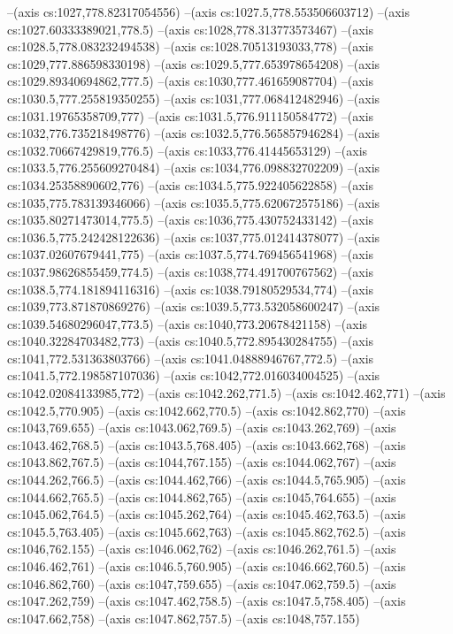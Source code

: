 --(axis cs:1027,778.82317054556)
--(axis cs:1027.5,778.553506603712)
--(axis cs:1027.60333389021,778.5)
--(axis cs:1028,778.313773573467)
--(axis cs:1028.5,778.083232494538)
--(axis cs:1028.70513193033,778)
--(axis cs:1029,777.886598330198)
--(axis cs:1029.5,777.653978654208)
--(axis cs:1029.89340694862,777.5)
--(axis cs:1030,777.461659087704)
--(axis cs:1030.5,777.255819350255)
--(axis cs:1031,777.068412482946)
--(axis cs:1031.19765358709,777)
--(axis cs:1031.5,776.911150584772)
--(axis cs:1032,776.735218498776)
--(axis cs:1032.5,776.565857946284)
--(axis cs:1032.70667429819,776.5)
--(axis cs:1033,776.41445653129)
--(axis cs:1033.5,776.255609270484)
--(axis cs:1034,776.098832702209)
--(axis cs:1034.25358890602,776)
--(axis cs:1034.5,775.922405622858)
--(axis cs:1035,775.783139346066)
--(axis cs:1035.5,775.620672575186)
--(axis cs:1035.80271473014,775.5)
--(axis cs:1036,775.430752433142)
--(axis cs:1036.5,775.242428122636)
--(axis cs:1037,775.012414378077)
--(axis cs:1037.02607679441,775)
--(axis cs:1037.5,774.769456541968)
--(axis cs:1037.98626855459,774.5)
--(axis cs:1038,774.491700767562)
--(axis cs:1038.5,774.181894116316)
--(axis cs:1038.79180529534,774)
--(axis cs:1039,773.871870869276)
--(axis cs:1039.5,773.532058600247)
--(axis cs:1039.54680296047,773.5)
--(axis cs:1040,773.20678421158)
--(axis cs:1040.32284703482,773)
--(axis cs:1040.5,772.895430284755)
--(axis cs:1041,772.531363803766)
--(axis cs:1041.04888946767,772.5)
--(axis cs:1041.5,772.198587107036)
--(axis cs:1042,772.016034004525)
--(axis cs:1042.02084133985,772)
--(axis cs:1042.262,771.5)
--(axis cs:1042.462,771)
--(axis cs:1042.5,770.905)
--(axis cs:1042.662,770.5)
--(axis cs:1042.862,770)
--(axis cs:1043,769.655)
--(axis cs:1043.062,769.5)
--(axis cs:1043.262,769)
--(axis cs:1043.462,768.5)
--(axis cs:1043.5,768.405)
--(axis cs:1043.662,768)
--(axis cs:1043.862,767.5)
--(axis cs:1044,767.155)
--(axis cs:1044.062,767)
--(axis cs:1044.262,766.5)
--(axis cs:1044.462,766)
--(axis cs:1044.5,765.905)
--(axis cs:1044.662,765.5)
--(axis cs:1044.862,765)
--(axis cs:1045,764.655)
--(axis cs:1045.062,764.5)
--(axis cs:1045.262,764)
--(axis cs:1045.462,763.5)
--(axis cs:1045.5,763.405)
--(axis cs:1045.662,763)
--(axis cs:1045.862,762.5)
--(axis cs:1046,762.155)
--(axis cs:1046.062,762)
--(axis cs:1046.262,761.5)
--(axis cs:1046.462,761)
--(axis cs:1046.5,760.905)
--(axis cs:1046.662,760.5)
--(axis cs:1046.862,760)
--(axis cs:1047,759.655)
--(axis cs:1047.062,759.5)
--(axis cs:1047.262,759)
--(axis cs:1047.462,758.5)
--(axis cs:1047.5,758.405)
--(axis cs:1047.662,758)
--(axis cs:1047.862,757.5)
--(axis cs:1048,757.155)
